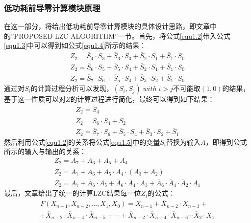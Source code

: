 \subsubsection{低功耗前导零计算模块原理}
在这一部分，将给出低功耗前导零计算模块的具体设计思路，即文章\cite{dimitrakopoulos2008low}中的''PROPOSED LZC ALGORITHM''一节。首先，将公式\ref{equ1.2}带入公式\ref{equ1.3}中可以得到如公式\ref{equ1.4}所示的结果：
\begin{equation}
\label{equ1.4}
\begin{gathered}
Z_2 = \overline{S}_4 \cdot S_3 + \overline{S}_3 \cdot S_3 + \overline{S}_2 \cdot S_1 + \overline{S}_1 \cdot S_0 \\
Z_2 = \overline{S}_6 \cdot S_5 + \overline{S}_5 \cdot S_4 + \overline{S}_2 \cdot S_1 + \overline{S}_1 \cdot S_0 \\
Z_2 = \overline{S}_7 \cdot S_6 + \overline{S}_5 \cdot S_4 + \overline{S}_3 \cdot S_2 + \overline{S}_1 \cdot S_0 
\end{gathered}
\end{equation}
通过对$S_i$的计算过程分析可以发现，$(S_i, S_j)\; with \; i > j$不可能取$(1, 0)$的结果，基于这一性质可以对$Z$的计算过程进行简化，最终可以得到如下结果：
\begin{equation}
\label{equ1.5}
\begin{gathered}
Z_2 = \overline{S}_4 \\
Z_2 = \overline{S}_6 \cdot S_4 + \overline{S}_2 \\
Z_2 = \overline{S}_7 \cdot S_6 + \overline{S}_5 \cdot S_4 + \overline{S}_3 \cdot S_2 + \overline{S}_1
\end{gathered}
\end{equation}
然后利用公式\ref{equ1.2}的关系将公式\ref{equ1.5}中的变量$S_i$替换为输入$A$，即得到公式所示的输入与输出的关系：
\begin{equation}
\label{equ1.6}
\begin{gathered}
Z_2 = A_7 + A_6 + A_5 + A_4 \\
Z_2 = A_7 + A_6 + \overline{A}_5 \cdot \overline{A}_4 \cdot (A_3 + A_2) \\
Z_2 = A_7 + \overline{A}_6 \cdot A_5 + \overline{A}_6 \cdot \overline{A}_4 \cdot A_3 + \overline{A}_6 \cdot \overline{A}_4 \cdot \overline{A}_2 \cdot A_1
\end{gathered}
\end{equation}
最后，文章\cite{dimitrakopoulos2008low}给出了统一的计算LZC结果每一位$Z_i$的公式：
\begin{multline}\label{equ1.7}
F(X_{n-1}, X_{n-2}, \dots , X_{1}, X_{0}) = X_{n-1} + \overline{X}_{n-2} \cdot X_{n-3} + \\
+ \overline{X}_{n-2} \cdot \overline{X}_{n-4} \cdot \overline{X}_{n-5} + \cdots + \overline{X}_{n-2} \cdot \overline{X}_{n-4} \cdot \overline{X}_{n-6} \cdots \overline{X}_2 \cdot X_1
\end{multline}

